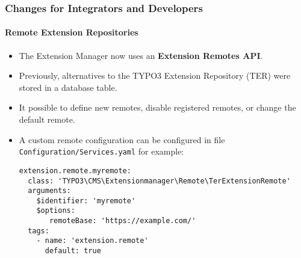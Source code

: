 %

\begin{frame}[fragile]
	\frametitle{Changes for Integrators and Developers}
	\framesubtitle{Remote Extension Repositories}


	\begin{itemize}
		\item The Extension Manager now uses an \textbf{Extension Remotes API}.
		\item Previously, alternatives to the TYPO3 Extension Repository (TER)
			were stored in a database table.
		\item It possible to define new remotes, disable registered remotes,
			or change the default remote.
		\item A custom remote configuration can be configured in file
			\small\texttt{Configuration/Services.yaml} for example:
\begin{lstlisting}
extension.remote.myremote:
  class: 'TYPO3\CMS\Extensionmanager\Remote\TerExtensionRemote'
  arguments:
    $identifier: 'myremote'
    $options:
       remoteBase: 'https://example.com/'
  tags:
    - name: 'extension.remote'
      default: true
\end{lstlisting}

	\end{itemize}

\end{frame}

